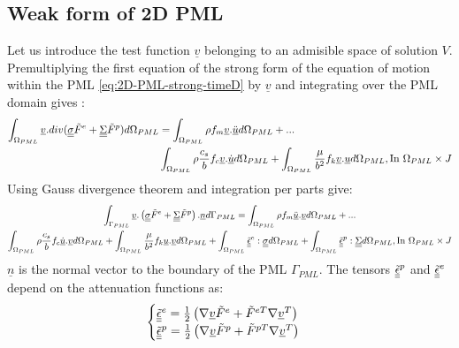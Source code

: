 \subsection{Weak form of 2D PML}
Let us introduce the test function $\underline{v}$ belonging to an admisible space of solution $V$. Premultiplying the first equation of the strong form of the equation of motion within the PML \ref{eq:2D-PML-strong-timeD} by $\underline{v}$ and integrating over the PML domain gives :
\begin{align}
\int_{\Omega_{PML}} \underline{v}.div(\underline{\underline{\sigma}}\tilde{F}^e + \underline{\underline{\Sigma}}\tilde{F}^p) d\Omega_{PML} & = \int_{\Omega_{PML}} \rho f_m \underline{v}.\underline{\ddot{u}} d\Omega_{PML} + ... \nonumber\\
&  \int_{\Omega_{PML}} \rho \frac{c_s}{b} f_c \underline{v}.\underline{\dot{u}} d\Omega_{PML} +  \int_{\Omega_{PML}} \frac{\mu}{b^2}f_k \underline{v}. \underline{u}  d\Omega_{PML},  \text{In } \Omega_{PML} \times J 
\end{align}
Using Gauss divergence theorem and integration per parts give:
\begin{multline}
\int_{\Gamma_{PML}} \underline{v} .\left(\underline{\underline{\sigma}}\tilde{F}^e + \underline{\underline{\Sigma}}\tilde{F}^p \right).\underline{n} d\Gamma_{PML}  = \int_{\Omega_{PML}} \rho f_m \underline{\ddot{u}} . \underline{v} d\Omega_{PML} + ... \nonumber\\
\int_{\Omega_{PML}} \rho \frac{c_s}{b} f_c \underline{\dot{u}} . \underline{v} d\Omega_{PML} +  \int_{\Omega_{PML}} \frac{\mu}{b^2}f_k \underline{u} . \underline{v} d\Omega_{PML} +\int_{\Omega_{PML}} \underline{\underline{\tilde{\epsilon}}}^e : \underline{\underline{\sigma}} d\Omega_{PML} + \int_{\Omega_{PML}} \underline{\underline{\tilde{\epsilon}}}^p : \underline{\underline{\Sigma}} d\Omega_{PML},  \text{In } \Omega_{PML} \times J 
\label{eq:weak-form-motion}
\end{multline}
$\underline{n}$ is the normal vector to the boundary of the PML $\Gamma_{PML}$. The tensors $\underline{\underline{\tilde{\epsilon}}}^p$ and $\underline{\underline{\tilde{\epsilon}}}^e$ depend on the attenuation functions as:
\begin{equation}
\begin{cases}
\underline{\underline{\tilde{\epsilon}}}^e = \frac{1}{2}\left(\nabla \underline{v} \tilde{F}^e + \tilde{F}^{eT} \nabla \underline{v}^T  \right) \\
\underline{\underline{\tilde{\epsilon}}}^p = \frac{1}{2}\left(\nabla \underline{v} \tilde{F}^p + \tilde{F}^{pT} \nabla \underline{v}^T  \right)
\end{cases}
\end{equation}
